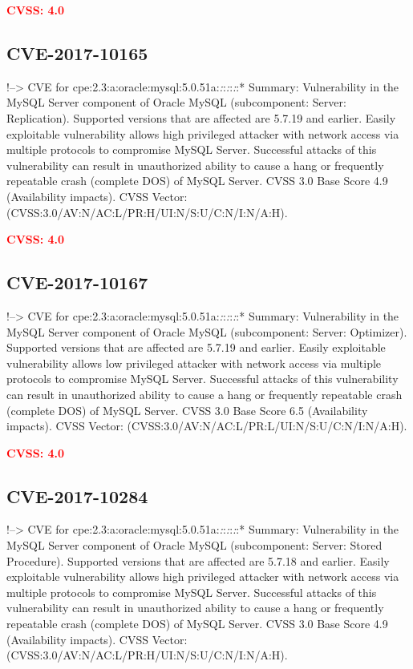 \documentclass[a4paper, 12pt]{article}
\begin{document}
\textbf{\textcolor{red}{CVSS: 4.0}}

\hypertarget{cve-2017-10165}{%
\subsection{CVE-2017-10165}\label{cve-2017-10165}}

!--\textgreater{} CVE for
cpe:2.3:a:oracle:mysql:5.0.51a:\emph{:}:\emph{:}:\emph{:}:* Summary:
Vulnerability in the MySQL Server component of Oracle MySQL
(subcomponent: Server: Replication). Supported versions that are
affected are 5.7.19 and earlier. Easily exploitable vulnerability allows
high privileged attacker with network access via multiple protocols to
compromise MySQL Server. Successful attacks of this vulnerability can
result in unauthorized ability to cause a hang or frequently repeatable
crash (complete DOS) of MySQL Server. CVSS 3.0 Base Score 4.9
(Availability impacts). CVSS Vector:
(CVSS:3.0/AV:N/AC:L/PR:H/UI:N/S:U/C:N/I:N/A:H).

\textbf{\textcolor{red}{CVSS: 4.0}}

\hypertarget{cve-2017-10167}{%
\subsection{CVE-2017-10167}\label{cve-2017-10167}}

!--\textgreater{} CVE for
cpe:2.3:a:oracle:mysql:5.0.51a:\emph{:}:\emph{:}:\emph{:}:* Summary:
Vulnerability in the MySQL Server component of Oracle MySQL
(subcomponent: Server: Optimizer). Supported versions that are affected
are 5.7.19 and earlier. Easily exploitable vulnerability allows low
privileged attacker with network access via multiple protocols to
compromise MySQL Server. Successful attacks of this vulnerability can
result in unauthorized ability to cause a hang or frequently repeatable
crash (complete DOS) of MySQL Server. CVSS 3.0 Base Score 6.5
(Availability impacts). CVSS Vector:
(CVSS:3.0/AV:N/AC:L/PR:L/UI:N/S:U/C:N/I:N/A:H).

\textbf{\textcolor{red}{CVSS: 4.0}}

\hypertarget{cve-2017-10284}{%
\subsection{CVE-2017-10284}\label{cve-2017-10284}}

!--\textgreater{} CVE for
cpe:2.3:a:oracle:mysql:5.0.51a:\emph{:}:\emph{:}:\emph{:}:* Summary:
Vulnerability in the MySQL Server component of Oracle MySQL
(subcomponent: Server: Stored Procedure). Supported versions that are
affected are 5.7.18 and earlier. Easily exploitable vulnerability allows
high privileged attacker with network access via multiple protocols to
compromise MySQL Server. Successful attacks of this vulnerability can
result in unauthorized ability to cause a hang or frequently repeatable
crash (complete DOS) of MySQL Server. CVSS 3.0 Base Score 4.9
(Availability impacts). CVSS Vector:
(CVSS:3.0/AV:N/AC:L/PR:H/UI:N/S:U/C:N/I:N/A:H).
\end{document}
